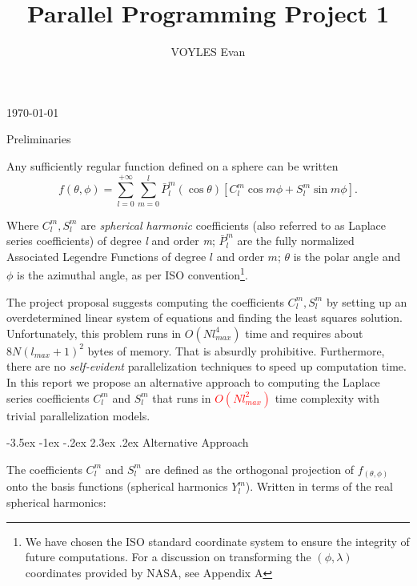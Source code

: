 \documentclass[a4paper]{article}
\title{\Large Parallel Programming Project 1}
\author{VOYLES Evan}
\date{}
\makeatletter
\renewcommand\section{\@startsection{section}{1}{\z@}%
                                  {-3.5ex \@plus -1ex \@minus -.2ex}%
                                  {2.3ex \@plus.2ex}%
                                  {\normalfont\normalsize\bfseries}}
\theoremstyle{definition}
\makeatother
\begin{document}
\makeatletter
\maketitle
\begin{center}
    \vspace{-.2in}
    \today
\end{center}
\makeatother

\newenvironment{norm}{
    \normalfont
}

\section{Preliminaries}

Any sufficiently regular function defined on a sphere can be written
\begin{equation} \label{eq:f_iso}
    f(\theta, \phi) = \sum_{l = 0}^{+\infty}\sum_{m = 0}^l \bar P_l^m(\cos\theta)[C_l^m\cos m\phi + S_l^m \sin m \phi].
\end{equation}

Where $C_l^m, S_l^m$ are \textit{spherical harmonic} coefficients (also referred to as Laplace series coefficients) of 
degree \textit{l} and order \textit{m}; $\bar P_l^m$ are the fully normalized Associated Legendre Functions of degree $l$ and order $m$;
$\theta$ is the polar angle and $\phi$ is the azimuthal angle, as per ISO convention\footnote{We have chosen the ISO standard coordinate system to 
ensure the integrity of future computations. For a discussion on transforming the $(\phi, \lambda)$ coordinates provided by NASA, see Appendix A}.

The project proposal suggests computing the coefficients $C_l^m, S_l^m$ by setting up an overdetermined linear system of equations and finding the least squares
solution. Unfortunately, this problem runs in $O(Nl_{max}^4)$ time and requires about $8N(l_{max} + 1)^2$ bytes of memory. That is absurdly prohibitive. Furthermore, there 
are no \textit{self-evident} parallelization techniques to speed up computation time. In this report we propose an alternative approach to computing the Laplace series coefficients
$C_l^m$ and $S_l^m$ that runs in \textcolor{red}{$O(Nl_{max}^2)$} time complexity with trivial parallelization models.

\section{Alternative Approach}

The coefficients $C_l^m$ and $S_l^m$ are defined as the orthogonal projection of $f_(\theta, \phi)$ onto the basis functions (spherical harmonics $Y_l^m$). Written in terms of the real
spherical harmonics:
\end{document}
